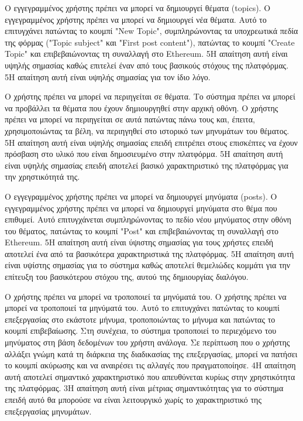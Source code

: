 \begin{enumerate}[label=\textbf{<ΛΑ-\arabic*>}, leftmargin=\parindent, align=left, labelwidth=\parindent, labelsep=0pt]
	\sysReqItem
		{\label{srs:functional-srs-create-topic}}
		{Ο εγγεγραμμένος χρήστης πρέπει να μπορεί να δημιουργεί θέματα (topics).}
		{Ο εγγεγραμμένος χρήστης πρέπει να μπορεί να δημιουργεί νέα θέματα. Αυτό το επιτυγχάνει πατώντας το κουμπί "New Topic", συμπληρώνοντας τα υποχρεωτικά πεδία της φόρμας ("Topic subject" και "First post content"), πατώντας το κουμπί "Create Topic" και επιβεβαιώνοντας τη συναλλαγή στο Ethereum.}
		{5}{Η απαίτηση αυτή είναι υψηλής σημασίας καθώς επιτελεί έναν από τους βασικούς στόχους της πλατφόρμας.}
		{5}{Η απαίτηση αυτή είναι υψηλής σημασίας για τον ίδιο λόγο.}

	\sysReqItem
		{\label{srs:functional-srs-browse-topics}}
		{Ο χρήστης πρέπει να μπορεί να περιηγείται σε θέματα.}
		{Το σύστημα πρέπει να μπορεί να προβάλλει τα θέματα που έχουν δημιουργηθεί στην αρχική οθόνη. Ο χρήστης πρέπει να μπορεί να περιηγείται σε αυτά πατώντας πάνω τους και, έπειτα, χρησιμοποιώντας τα βέλη, να περιηγηθεί στο ιστορικό των μηνυμάτων του θέματος.}
		{5}{Η απαίτηση αυτή είναι υψηλής σημασίας επειδή επιτρέπει στους επισκέπτες να έχουν πρόσβαση στο υλικό που είναι δημοσιευμένο στην πλατφόρμα.}
		{5}{Η απαίτηση αυτή είναι υψηλής σημασίας επειδή αποτελεί βασικό χαρακτηριστικό της πλατφόρμας για την χρηστικότητά της.}

	\sysReqItem
		{\label{srs:functional-srs-create-post}}
		{Ο εγγεγραμμένος χρήστης πρέπει να μπορεί να δημιουργεί μηνύματα (posts).}
		{Ο εγγεγραμμένος χρήστης πρέπει να μπορεί να δημιουργεί μηνύματα στο θέμα που επιθυμεί. Αυτό επιτυγχάνεται συμπληρώνοντας το πεδίο νέου μηνύματος στην οθόνη του θέματος, πατώντας το κουμπί "Post" και επιβεβαιώνοντας τη συναλλαγή στο Ethereum.}
		{5}{Η απαίτηση αυτή είναι ύψιστης σημασίας για τους χρήστες επειδή αποτελεί ένα από τα βασικότερα χαρακτηριστικά της πλατφόρμας.}
		{5}{Η απαίτηση αυτή είναι υψίστης σημασίας για το σύστημα καθώς αποτελεί θεμελιώδες κομμάτι για την επίτευξη του βασικότερου στόχου της, αυτού της δημιουργίας διαλόγου.}

	\sysReqItem
		{\label{srs:functional-srs-modify-post}}
		{Ο χρήστης πρέπει να μπορεί να τροποποιεί τα μηνύματά του.}
		{Ο χρήστης πρέπει να μπορεί να τροποποιεί τα μηνύματά του. Αυτό το επιτυγχάνει πατώντας το κουμπί επεξεργασίας στο εκάστοτε μήνυμα, τροποποιώντας το μήνυμα και πατώντας το κουμπί επιβεβαίωσης. Στη συνέχεια, το σύστημα τροποποιεί το περιεχόμενο του μηνύματος στη βάση δεδομένων του χρήστη ανάλογα. Σε περίπτωση που ο χρήστης αλλάξει γνώμη κατά τη διάρκεια της διαδικασίας της επεξεργασίας, μπορεί να πατήσει το κουμπί ακύρωσης και να αναιρέσει τις αλλαγές που πραγματοποίησε.}
		{4}{Η απαίτηση αυτή αποτελεί σημαντικό χαρακτηριστικό που απευθύνεται κυρίως στην χρηστικότητα της πλατφόρμας.}
		{3}{Η απαίτηση αυτή είναι μέτριας σημαντικότητας για το σύστημα επειδή αυτό θα μπορούσε να είναι λειτουργικό χωρίς το χαρακτηριστικό της επεξεργασίας μηνυμάτων.}


\end{enumerate}
